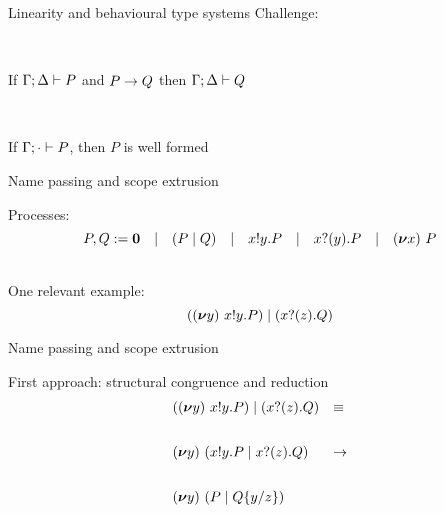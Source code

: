 \documentclass[aspectratio=169,hyperref={pdfpagelabels=false}]{beamer}
\begin{document}
\begin{frame}{Linearity and behavioural type systems}
  Challenge:

  \ \\
  \begin{theorem}
  If \( \Gamma;\Delta \vdash P \) and \( P \rightarrow Q \) then \( \Gamma;\Delta \vdash Q \)
  \end{theorem}

  \ \\
  \begin{theorem}
  If \( \Gamma;\cdot \vdash P \), then \( P \) is well formed
  \end{theorem}
\end{frame}



\begin{frame}{Name passing and scope extrusion}


    Processes:
      \[P,Q := \bm{0}\quad|\quad (P \mid Q) \quad|\quad x ! y . P\quad|\quad x ? (y) . P\quad|\quad (\bm{\nu} x)~P\]
    

  \ \\
    One relevant example:
      \[((\bm{\nu} y)~x ! y . P) \mid (x ? (z) . Q)\]
      
\end{frame}

\begin{frame}{Name passing and scope extrusion}

  First approach: structural congruence and reduction \\

  \[
  \begin{array}{ll}
    \Ppar{(\Pres{y}{\Pout{x}{y}{P}})}{(\Pin{x}{z}{Q})} & \equiv\\[2em]
    \Pres{y}{ (\Ppar{\Pout{x}{y}{P}}{\Pin{x}{z}{Q}})} & \rightarrow\\[2em]
    \Pres{y}{(\Ppar{P}{\subst{Q}{y}{z}})} & %
  \end{array}
  \]
\end{frame}

\newcommand{\hg}[1]{\colorbox{mygreen}{$\displaystyle #1$}}
\newcommand{\hr}[1]{\colorbox{myred}{$\displaystyle #1$}}
\end{document}
